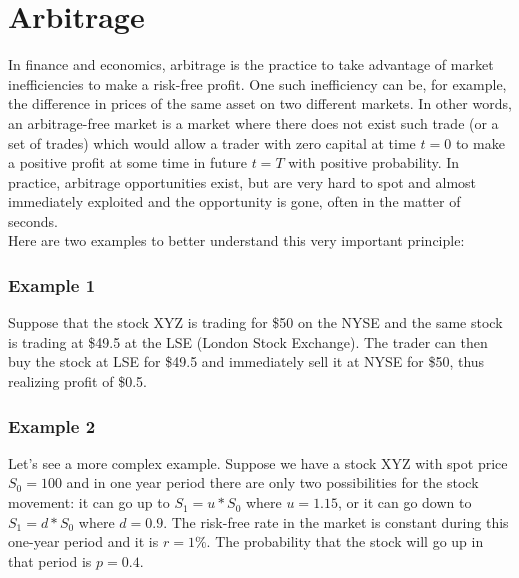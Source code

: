 \documentclass[times, utf8, diplomski]{fer}
\begin{document}
\section{Arbitrage}
In finance and economics, arbitrage is the practice to take advantage of market inefficiencies to make a risk-free profit. One such inefficiency can be, for example, the difference in prices of the same asset on two different markets. In other words, an arbitrage-free market is a market where there does not exist such trade (or a set of trades) which would allow a trader with zero capital at time $t=0$ to make a positive profit at some time in future $t=T$ with positive probability. In practice, arbitrage opportunities exist, but are very hard to spot and almost immediately exploited and the opportunity is gone, often in the matter of seconds.\\Here are two examples to better understand this very important principle:
\subsubsection{Example 1}
Suppose that the stock XYZ is trading for \$50 on the NYSE and the same stock is trading at \$49.5 at the LSE (London Stock Exchange). The trader can then buy the stock at LSE for \$49.5 and immediately sell it at NYSE for \$50, thus realizing profit of \$0.5. 
\subsubsection{Example 2}
Let's see a more complex example. Suppose we have a stock XYZ with spot price $S_0 = 100$ and in one year period there are only two possibilities for the stock movement: it can go up to $S_1 = u * S_0$ where $u=1.15$, or it can go down to $S_1 = d * S_0$ where $d=0.9$. The risk-free rate in the market is constant during this one-year period and it is $r=1\%$. The probability that the stock will go up in that period is $p=0.4$. 

\end{document}
